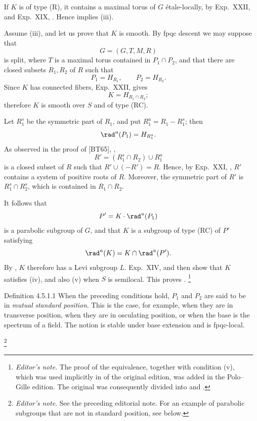 If \(K\) is of type \textup{(R)}, it contains a maximal torus of \(G\)
étale-locally, by Exp.\ XXII,  and Exp.\ XIX, .  Hence
\textup{} implies \textup{(iii)}.

Assume \textup{(iii)}, and let us prove that \(K\) is smooth.  By
fpqc descent we may suppose that
\[
 G=(G,T,M,R)
\]
is split, where \(T\) is a maximal torus contained in \(P_1\cap P_2\),
and that there are closed subsets \(R_1,R_2\) of \(R\) such that
\[
 P_1=H_{R_1},\qquad P_2=H_{R_2}.
\]
Since \(K\) has connected fibers, Exp.\ XXII,  gives
\[
 K=H_{R_1\cap R_2};
\]
therefore \(K\) is smooth over \(S\) and of type \textup{(RC)}.

Let \(R_1^s\) be the symmetric part of \(R_1\), and put
\(R_1^a=R_1-R_1^s\); then
\[
 \rad^u(P_1)=H_{R_1^a}.
\]
As observed in the proof of \textup{[BT65]}, ,
\[
 R'=(R_1^s\cap R_2)\cup R_1^a
\]
is a closed subset of \(R\) such that \(R'\cup(-R')=R\).  Hence, by
Exp.\ XXI, , \(R'\) contains a system of positive roots of \(R\).
Moreover, the symmetric part of \(R'\) is \(R_1^s\cap R_2^s\), which
is contained in \(R_1\cap R_2\).

It follows that
\[
 P'=K\cdot\rad^u(P_1)
\]
is a parabolic subgroup of \(G\), and that \(K\) is a subgroup of
type \textup{(RC)} of \(P'\) satisfying
\[
 \rad^u(K)=K\cap\rad^u(P').
\]
By , \(K\) therefore has a Levi subgroup \(L\).  Exp.\ XIV, 
and  then show that \(K\) satisfies \textup{(iv)}, and also
\textup{(v)} when \(S\) is semilocal.  This proves .
\SGAQED
\footnote{\emph{Editor's note.} The proof of the equivalence, together
with condition \textup{(v)}, which was used implicitly in  of the
original edition, was added in the Polo--Gille edition.  The original
 was consequently divided into  and .}

\begin{sgastatement}{Definition 4.5.1.1}
When the preceding conditions hold, \(P_1\) and \(P_2\) are said to be
in \emph{mutual standard position}.  This is the case, for example,
when they are in transverse position, when they are in osculating
position, or when the base is the spectrum of a field.  The notion is
stable under base extension and is fpqc-local.
\end{sgastatement}
\footnote{\emph{Editor's note.} See the preceding editorial note.  For
an example of parabolic subgroups that are not in standard position,
see  below.}

